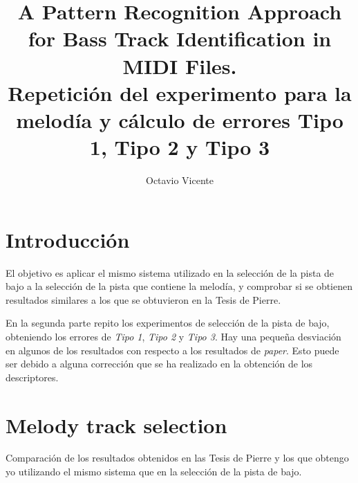 \documentclass{llncs}
\begin{document}
\title{A Pattern Recognition Approach for Bass Track Identification in MIDI Files.\\ Repetición del
experimento para la melodía y cálculo de errores Tipo 1, Tipo 2 y Tipo 3}
%
%
\author{Octavio Vicente}
%
%
%

\maketitle              %






\section{Introducción}
El objetivo es aplicar el mismo sistema utilizado en la selección de la pista de bajo a la 
selección de la pista que contiene la melodía, y comprobar si se obtienen resultados similares
a los que se obtuvieron en la Tesis de Pierre.

En la segunda parte repito los experimentos de selección de la pista de bajo, obteniendo los
errores de \emph{Tipo 1}, \emph{Tipo 2} y \emph{Tipo 3}. Hay una pequeña desviación en algunos
de los resultados con respecto a los resultados de \emph{paper}. Esto puede ser debido a alguna
corrección que se ha realizado en la obtención de los descriptores.

\section{Melody track selection}

Comparación de los resultados obtenidos en las Tesis de Pierre y los que obtengo yo utilizando el
mismo sistema que en la selección de la pista de bajo. 
\end{document}
